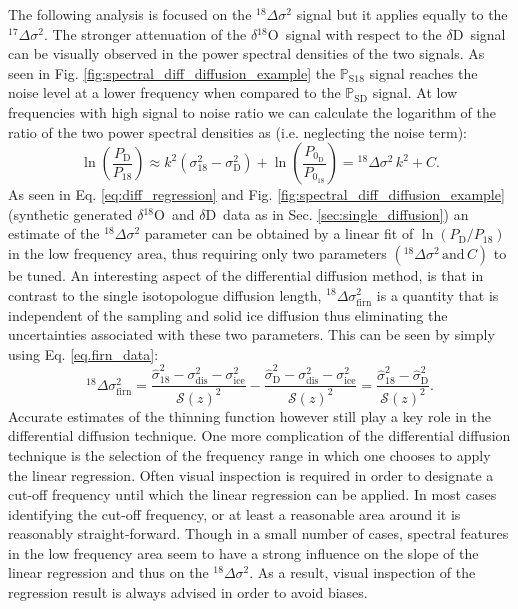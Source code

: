 \documentclass[11pt, draftcls, onecolumn]{IEEEtran} %
\numberwithin{equation}{section}
\numberwithin{table}{section}
\numberwithin{figure}{section}
\newcommand{\delOx}{$\delta{}^{18}\mathrm{O}$}
\newcommand{\delD}{$\delta\mathrm{D}$}
\begin{document}
The following analysis is focused on the ${}^{18}\Delta\sigma^2$ signal but it applies equally to 
the ${}^{17}\Delta\sigma^2$.
The stronger attenuation of the \delOx~signal with respect to the \delD~signal can be visually observed in the 
power spectral densities of the two signals. As seen in Fig. \ref{fig:spectral_diff_diffusion_example} the $\mathbb{P}_{\mathrm{S18}}$
signal reaches the noise level at a lower frequency when compared to the $\mathbb{P}_{\mathrm{SD}}$ signal.
At low frequencies  with high signal to noise ratio we can calculate the logarithm of the ratio of the two power spectral densities as
(i.e. neglecting the noise term):
\begin{equation} \label{eq:diff_regression}
\ln \left(\frac{P_\mathrm{D}}{P_{18}}\right) \approx k^2\left( \sigma^2_{18} - \sigma^2_{\mathrm{D}}\right) + 
\ln\left(\frac{P_{0_\mathrm{D}}}{P_{0_{18}}}\right) =
 {}^{18}\Delta \sigma^2\,k^2  + C.
\end{equation}
As seen in Eq. \ref{eq:diff_regression} and Fig. \ref{fig:spectral_diff_diffusion_example} 
(synthetic generated \delOx~and \delD~data as in Sec. \ref{sec:single_diffusion}) an estimate of the
${}^{18}\Delta\sigma^2$ parameter can be obtained by a linear fit of 
$\ln \left({P_\mathrm{D}}/{P_{18}}\right)$ in the low frequency area, 
thus requiring only two parameters $({}^{18}\Delta\sigma^2\mathrm{ \,and\, } C)$ to be tuned.
An interesting aspect of the differential diffusion method, is that in contrast to the single isotopologue diffusion length,
${}^{18}\Delta\sigma^2_\mathrm{firn}$ is a quantity that is independent of the sampling and solid ice diffusion thus eliminating the
uncertainties associated with these two parameters. This can be seen by simply using Eq. \ref{eq.firn_data}:
\begin{equation}
{}^{18}\Delta\sigma^2_{\mathrm{firn}} = \frac{\hat{\sigma}_{18}^2 - \sigma_{\mathrm{dis}}^2 - \sigma_{\mathrm{ice}}^2}{\mathcal{S}(z)^2} -  
\frac{\hat{\sigma}_\mathrm{D}^2 - 
	\sigma_{\mathrm{dis}}^2 - \sigma_{\mathrm{ice}}^2}{\mathcal{S}(z)^2} =  \frac{\hat{\sigma}_{18}^2 - 
	\hat{\sigma}_\mathrm{D}^2}{\mathcal{S}(z)^2}.
\end{equation}
Accurate estimates of the thinning function however still play a key role in the differential diffusion technique.
One more complication of the differential diffusion technique is the selection of the frequency range in 
which one chooses to apply the linear regression. Often visual inspection is required in order to 
designate a cut-off frequency until which the linear regression can be applied. In most cases 
identifying the cut-off frequency, or at least a reasonable area around it is reasonably straight-forward.
Though in a small number of cases, spectral features in the low frequency area seem to have a strong 
influence on the slope of the linear regression and thus on the ${}^{18}\Delta\sigma^2$. As a result,
visual inspection of the regression result is always advised in order to avoid biases.
\end{document}
